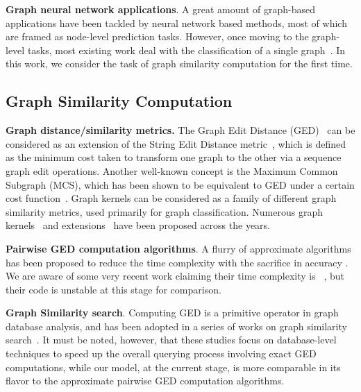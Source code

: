\documentclass[sigconf]{acmart}
\begin{document}
\noindent\textbf{Graph neural network applications}. A great amount of graph-based applications have been tackled by neural network based methods, most of which are framed as node-level prediction tasks.
However, once moving to the graph-level tasks, most existing work deal with the classification of a single graph~\cite{defferrard2016convolutional,simonovsky2017dynamic,niepert2016learning,simonovsky2017dynamic,gligorijevic2017deepnf,zhao2018substructure,ying2018hierarchical}. In this work, we consider the task of graph similarity computation for the first time.



\subsection{Graph Similarity Computation}
\noindent\textbf{Graph distance/similarity metrics.} The Graph Edit Distance (GED)~\cite{bunke1983distance} can be considered as an extension of the String Edit Distance metric~\cite{levenshtein1966binary}, which is defined as the minimum cost taken to transform one graph to the other via a sequence graph edit operations. Another well-known concept is the Maximum Common Subgraph (MCS), which has been shown to be equivalent to GED under a certain cost function~\cite{bunke1997relation}. Graph kernels can be considered as a family of different graph similarity metrics, used primarily for graph classification. Numerous graph kernels~\cite{gartner2003graph,horvath2004cyclic,nikolentzos2017matching} and extensions~\cite{yanardag2015deep,nikolentzos2018degeneracy} have been proposed across the years.

\noindent\textbf{Pairwise GED computation algorithms}. 
A flurry of approximate algorithms has been proposed to reduce the time complexity with the sacrifice in accuracy \cite{neuhaus2006fast,riesen2009approximate,fankhauser2011speeding,bougleux2017graph,daller2018approximate}.  We are aware of some very recent work claiming their time complexity is ~\cite{bougleux2017graph}, but their code is unstable at this stage for comparison.

\noindent\textbf{Graph Similarity search}. 
Computing GED is a primitive operator in graph database analysis, and has been adopted in a series of works on graph similarity search~\cite{zeng2009comparing,wang2012efficient,zheng2013graph,zhao2013partition,liang2017similarity}. It must be noted, however, that these studies focus on database-level techniques to speed up the overall querying process involving exact GED computations, while our model, at the current stage, is more comparable in its flavor to the approximate pairwise GED computation algorithms.
\end{document}
